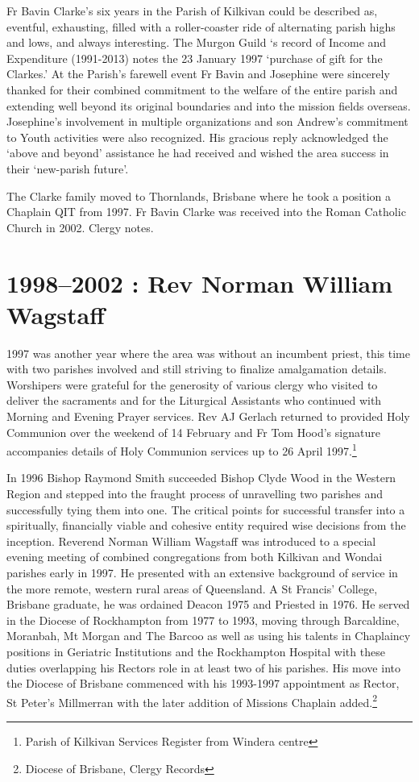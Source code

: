 Fr Bavin Clarke's six years in the Parish of Kilkivan could be described as, eventful, exhausting, filled with a roller-coaster ride of alternating parish highs and lows, and always interesting. The Murgon Guild `s record of Income and Expenditure (1991-2013) notes the 23 January 1997 `purchase of gift for the Clarkes.' At the Parish's farewell event Fr Bavin and Josephine were sincerely thanked for their combined commitment to the welfare of the entire parish and extending well beyond its original boundaries and into the mission fields overseas. Josephine's involvement in multiple organizations and son Andrew's commitment to Youth activities were also recognized. His gracious reply acknowledged the `above and beyond' assistance he had received and wished the area success in their `new-parish future'.



The Clarke family moved to Thornlands, Brisbane where he took a position a Chaplain QIT from 1997. Fr Bavin Clarke was received into the Roman Catholic Church in 2002. Clergy notes.



\section{1998--2002 : Rev Norman William Wagstaff}



1997 was another year where the area was without an incumbent priest, this time with two parishes involved and still striving to finalize amalgamation details. Worshipers were grateful for the generosity of various clergy who visited to deliver the sacraments and for the Liturgical Assistants who continued with Morning and Evening Prayer services. Rev AJ Gerlach returned to provided Holy Communion over the weekend of 14 February and Fr Tom Hood's signature accompanies details of Holy Communion services up to 26 April 1997.\footnote{Parish of Kilkivan Services Register from Windera centre}


In 1996 Bishop Raymond Smith succeeded Bishop Clyde Wood in the Western Region and stepped into the fraught process of unravelling two parishes and successfully tying them into one. The critical points for successful transfer into a spiritually, financially viable and cohesive entity required wise decisions from the inception. Reverend Norman William Wagstaff was introduced to a special evening meeting of combined congregations from both Kilkivan and Wondai parishes early in 1997. He presented with an extensive background of service in the more remote, western rural areas of Queensland. A St Francis' College, Brisbane graduate, he was ordained Deacon 1975 and Priested in 1976. He served in the Diocese of Rockhampton from 1977 to 1993, moving through Barcaldine, Moranbah, Mt Morgan and The Barcoo as well as using his talents in Chaplaincy positions in Geriatric Institutions and the Rockhampton Hospital with these duties overlapping his Rectors role in at least two of his parishes. His move into the Diocese of Brisbane commenced with his 1993-1997 appointment as Rector, St Peter's Millmerran with the later addition of Missions Chaplain added.\footnote{Diocese of Brisbane, Clergy Records}


